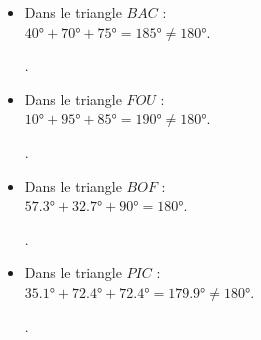 \begin{Maquette}[Fiche,CorrigeFin,Colonnes=2]{}
\begin{multicols}{2}
      \begin{Solution}
         \begin{itemize}
            \item Dans le triangle $BAC$ : \\
               $\ang{40}+\ang{70}+\ang{75} =\ang{185} \neq \ang{180}$. \par
               .
            \item Dans le triangle $FOU$ : \\
               $\ang{10}+\ang{95}+\ang{85} =\ang{190} \neq \ang{180}$. \par
               .
            \item Dans le triangle $BOF$ : \\
               $\ang{57,3}+\ang{32,7}+\ang{90} =\ang{180}$. \par
               .
            \item Dans le triangle $PIC$ : \\
               $\ang{35,1}+\ang{72,4}+\ang{72,4} =\ang{179,9} \neq \ang{180}$. \par
               .
         \end{itemize}
      \end{Solution}
      

\end{multicols}
\end{Maquette}
